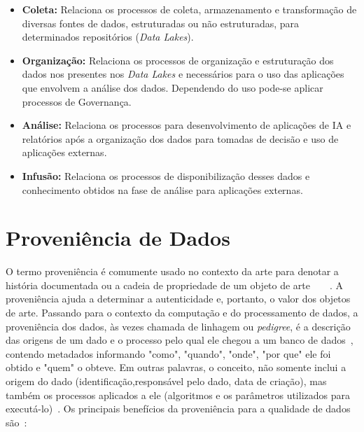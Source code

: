 \documentclass[portugues]{ic-tese}
\begin{document}
\begin{itemize}
\item \textbf{Coleta:} Relaciona os processos de coleta, armazenamento e transformação de diversas fontes de dados, estruturadas ou não estruturadas, para determinados repositórios (\textit{Data Lakes}).
\item \textbf{Organização:} Relaciona os processos de organização e estruturação dos dados nos presentes nos \textit{Data Lakes} e necessários para o uso das aplicações que envolvem a análise dos dados. Dependendo do uso pode-se aplicar processos de Governança.
\item \textbf{Análise:} Relaciona os processos para desenvolvimento de aplicações de IA e relatórios após a organização dos dados para tomadas de decisão e uso de aplicações externas.
\item \textbf{Infusão:} Relaciona os processos de disponibilização desses dados e conhecimento obtidos na fase de análise para aplicações externas.
\end{itemize}

\section{Proveniência de Dados}

O termo proveniência é comumente usado no contexto da arte para denotar a história documentada ou a cadeia de propriedade de um objeto de arte~\citep{Moreau_2007}~\citep{Moreau_2008}~\citep{Moreau_2009}~\citep{Tan_2007}. A proveniência ajuda a determinar a autenticidade e, portanto, o valor dos objetos de arte. Passando para o contexto da computação e do processamento de dados, a proveniência dos dados, às vezes chamada de linhagem ou \textit{pedigree}, é a descrição das origens de um dado e o processo pelo qual ele chegou a um banco de dados~\citep{Buneman_2001}, contendo metadados informando "como", "quando", "onde", "por que" ele foi obtido e "quem" o obteve. Em outras palavras, o conceito, não somente inclui a origem do dado (identificação,responsável pelo dado, data de criação), mas também os processos aplicados a ele (algoritmos e os parâmetros utilizados para executá-lo)~\citep{Woodruff_1997}. Os principais benefícios da proveniência para a qualidade de dados são~\citep{Bose_2005}:
\end{document}

